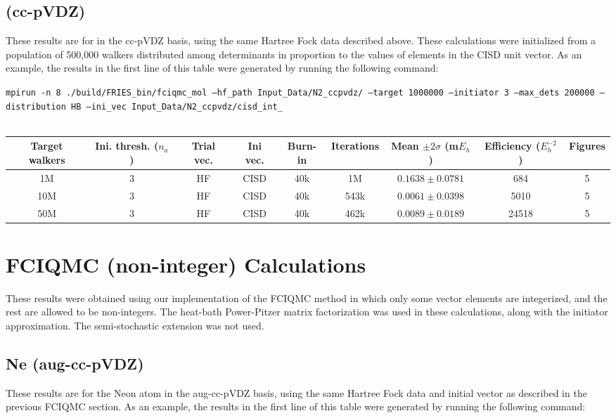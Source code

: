 \documentclass[12pt, landscape]{article}
\begin{document}
\subsection*{ (cc-pVDZ)}
These results are for  in the cc-pVDZ basis, using the same Hartree Fock data described above. These calculations were initialized from a population of 500,000 walkers distributed among determinants in proportion to the values of elements in the CISD unit vector. As an example, the results in the first line of this table were generated by running the following command:

\texttt{mpirun -n 8 ./build/FRIES\_bin/fciqmc\_mol --hf\_path Input\_Data/N2\_ccpvdz/ --target 1000000 --initiator 3 --max\_dets 200000 --distribution HB --ini\_vec Input\_Data/N2\_ccpvdz/cisd\_int\_}
\\~\\
\begin{tabular}{c|c|c|c|c|c|c|c|c}
Target walkers & Ini. thresh. ($n_a$) & Trial vec. & Ini vec. & Burn-in & Iterations & Mean $\pm 2 \sigma$ (m$E_h$) & Efficiency ($E_h^{-2}$) & Figures \\ \hline
1M & 3 & HF & CISD & 40k & 1M & $0.1638 \pm 0.0781$ & 684 & 5\\
10M & 3 & HF & CISD & 40k & 543k & $0.0061 \pm 0.0398$ & 5010 & 5\\
50M & 3 & HF & CISD & 40k & 462k & $0.0089 \pm 0.0189$ & 24518 & 5 \\
\end{tabular}


\section*{FCIQMC (non-integer) Calculations}
These results were obtained using our implementation of the FCIQMC method in which only some vector elements are integerized, and the rest are allowed to be non-integers. The heat-bath Power-Pitzer matrix factorization was used in these calculations, along with the initiator approximation. The semi-stochastic extension was not used.

\subsection*{Ne (aug-cc-pVDZ)}
These results are for the Neon atom in the aug-cc-pVDZ basis, using the same Hartree Fock data and initial vector as described in the previous FCIQMC section. As an example, the results in the first line of this table were generated by running the following command:
\end{document}
